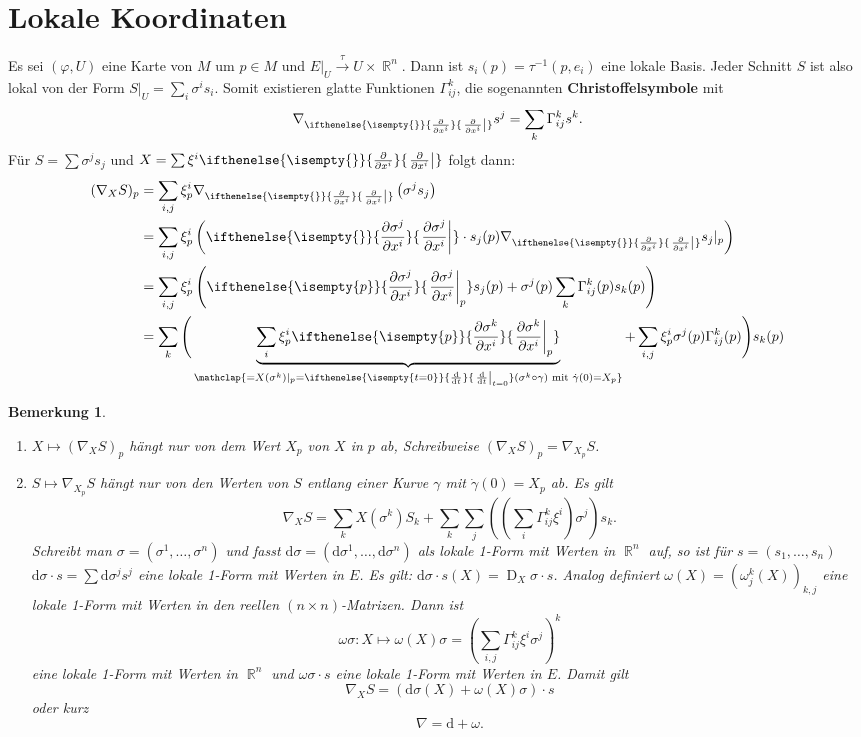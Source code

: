 \documentclass[paper=A4, twoside, chapterprefix=true, bibliography=totoc, headsepline]{scrbook}
\let\temp\phi{}
\let\phi\varphi{}
\let\varphi\temp{}
\let\temp\theta{}
\let\theta\vartheta{}
\let\vartheta\temp{}
\let\temp\epsilon{}
\let\epsilon\varepsilon{}
\let\varepsilon\temp{}
\let\temp\rho{}
\let\rho\varrho{}
\let\varrho\temp{}
\DeclareMathOperator{\R}{\mathbb{R}}
\DeclareMathOperator{\D}{D}         %
\newcommand{\dop}{\mathrm{d}}
\newcommand{\X}{\times}
\newcommand{\difffrac}[3][]{\ifthenelse{\isempty{#1}}{\frac{\dop #2}{\dop #3}}{\left. \frac{\dop #2}{\dop #3} \right|_{#1}}}
\newcommand{\pdifffrac}[3][]{\ifthenelse{\isempty{#1}}{\frac{\partial #2}{\partial #3}}{\left. \frac{\partial #2}{\partial #3} \right|_{#1}}}
\theoremstyle{plain}
\theoremstyle{nonumberplain}
\newtheorem{bem}{Bemerkung}
\theoremstyle{empty}
\theoremstyle{break}
\newcommand{\CmIndex}[2][]{\ifthenelse{\isempty{#1}}{\index{#2}}{\index{#1}}#2}
\newcommand{\CmMark}[2][]{\textbf{\CmIndex[#1]{#2}}}
\begin{document}
\section{Lokale Koordinaten}

Es sei $(\phi, U)$ eine Karte von $M$ um $p \in M$ und $E|_U \overset{\tau}{\to} U \X \R^n$. Dann ist $s_i(p) = \tau^{-1}(p, e_i)$ eine lokale Basis.
Jeder Schnitt $S$ ist also lokal von der Form $S|_U = \sum_i \sigma^{i} s_i$.
Somit existieren glatte Funktionen $\Gamma_{ij}^k$, die sogenannten \CmMark{Christoffelsymbole} mit 
\[ \nabla_{\pdifffrac{}{x^{i}}} s^j = \sum_k \Gamma_{ij}^k s^k. \]
F\"ur $S = \sum \sigma^j s_j$ und $X = \sum \xi^{i} \pdifffrac{}{x^{i}}$ folgt dann:
\begin{align*}
  (\nabla_XS)_p &= \sum_{i,j} \xi_p^{i} \nabla_{\pdifffrac{}{x^{i}}} \left(\sigma^j s_j\right)\\
  &= \sum_{i,j} \xi_p^{i} \left(\pdifffrac{\sigma^j}{x^{i}} \cdot s_j(p) \nabla_{\pdifffrac{}{x^{i}}} s_j|_p\right)\\
  &= \sum_{i,j} \xi_p^{i} \left(\pdifffrac[p]{\sigma^j}{x^{i}} s_j(p) + \sigma^j(p) \sum_k \Gamma_{ij}^k(p) s_k(p)\right)\\
  &= \sum_k \Bigg(\underbrace{\sum_i \xi_p^{i} \pdifffrac[p]{\sigma^k}{x^{i}}}_{\mathclap{= X(\sigma^k)|_p = \difffrac[t=0]{}{t} (\sigma^k \circ \gamma) \text{ mit } \dot\gamma(0) = X_p}} + \sum_{i,j} \xi_p^{i} \sigma^j(p) \Gamma_{ij}^k(p)\Bigg) s_k(p)
\end{align*}

\begin{bem}
  \begin{enumerate}[label=(\arabic*),leftmargin=*]
  \item $X \mapsto (\nabla_XS)_p$ h\"angt nur von dem Wert $X_p$ von  $X$ in $p$ ab, Schreibweise $(\nabla_XS)_p = \nabla_{X_p}S$.
  \item $S \mapsto \nabla_{X_p}S$ h\"angt nur von den Werten von $S$ entlang einer Kurve $\gamma$ mit $\dot\gamma(0) = X_p$ ab.
    Es gilt
    \[ \nabla_XS = \sum_k X(\sigma^k)S_k + \sum_k \sum_j\left(\left(\sum_i \Gamma_{ij}^k \xi^{i}\right) \sigma^j\right) s_k. \]
    Schreibt man $\sigma = (\sigma^1,\ldots ,\sigma^n)$ und fasst $\dop \sigma = (\dop \sigma^1,\ldots ,\dop \sigma^n)$ als lokale 1-Form mit Werten in $\R^n$ auf, so ist f\"ur $s=(s_1,\ldots ,s_n)$ $\dop\sigma \cdot s = \sum \dop \sigma^j s^j$ eine lokale 1-Form mit Werten in $E$. Es gilt: $\dop \sigma \cdot s(X) = \D_X \sigma \cdot s$.
    Analog definiert $\omega(X) = (\omega_j^k(X))_{k,j}$ eine lokale 1-Form mit Werten in den reellen $(n\X n)$-Matrizen.
    Dann ist 
    \[ \omega \sigma : X \mapsto \omega(X) \sigma = \left( \sum_{i,j} \Gamma_{ij}^k \xi^{i} \sigma^j \right)^k \]
    eine lokale 1-Form mit Werten in $\R^n$ und $\omega\sigma \cdot s$ eine lokale 1-Form mit Werten in $E$. Damit gilt
    \[ \nabla_XS = (\dop \sigma(X) + \omega(X) \sigma) \cdot s \]
    oder kurz
    \[ \nabla = \dop + \omega. \]
  \end{enumerate}
\end{bem}
\end{document}

